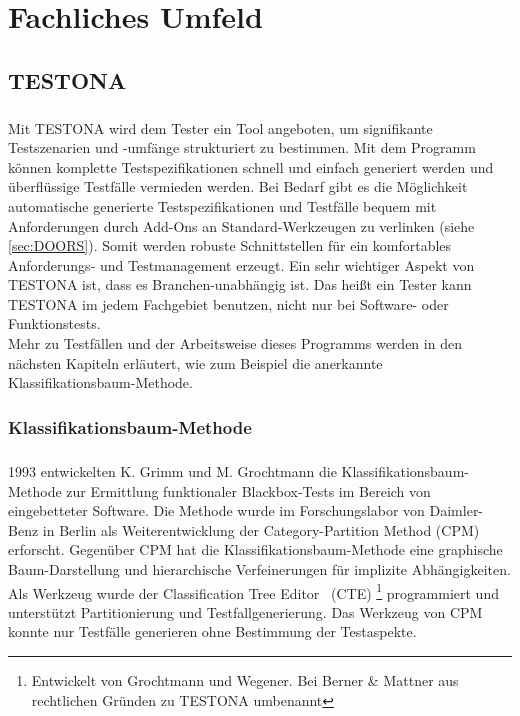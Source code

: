 \chapter{Fachliches Umfeld}\label{chp:fachlichesumfeld}

\section{TESTONA}\label{sec:Testona} 
\paragraph{}

Mit TESTONA wird dem Tester ein Tool angeboten, um signifikante Testszenarien und -umfänge strukturiert zu bestimmen. Mit dem Programm können komplette Testspezifikationen schnell und einfach generiert werden und überflüssige Testfälle vermieden werden. Bei Bedarf gibt es die Möglichkeit automatische generierte Testspezifikationen und Testfälle bequem mit Anforderungen durch Add-Ons an Standard-Werkzeugen zu verlinken (siehe \ref{sec:DOORS}). Somit werden robuste Schnittstellen für ein komfortables Anforderungs- und Testmanagement erzeugt. Ein sehr wichtiger Aspekt von TESTONA ist, dass es Branchen-unabhängig ist. Das heißt ein Tester kann TESTONA im jedem Fachgebiet benutzen, nicht nur bei Software- oder Funktionstests.\\

Mehr zu Testfällen und der Arbeitsweise dieses Programms werden in den nächsten Kapiteln erläutert, wie zum Beispiel die anerkannte Klassifikationsbaum-Methode.



\subsection{Klassifikationsbaum-Methode}\label{ssec:KM}
\paragraph{}
1993 entwickelten K. Grimm und M. Grochtmann die Klassifikationsbaum-Methode zur Ermittlung funktionaler Blackbox-Tests im Bereich von eingebetteter Software. Die Methode wurde im Forschungslabor von Daimler-Benz in Berlin als Weiterentwicklung der Category-Partition Method (CPM) erforscht. Gegenüber CPM hat die Klassifikationsbaum-Methode eine graphische Baum-Darstellung und hierarchische Verfeinerungen für implizite Abhängigkeiten. Als Werkzeug wurde der \glqq Classification Tree Editor\grqq~ (CTE) \footnote{Entwickelt von Grochtmann und Wegener\cite{TestCaseDesign}. Bei Berner  \& Mattner aus rechtlichen Gründen zu TESTONA umbenannt} programmiert und unterstützt Partitionierung und Testfallgenerierung. Das Werkzeug von CPM konnte nur Testfälle generieren ohne Bestimmung der Testaspekte\cite{ClassificationTrees}.

